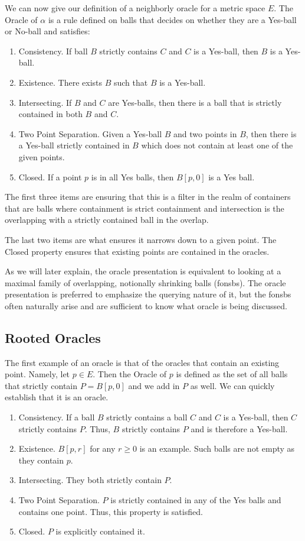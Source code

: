 \documentclass[12pt]{article}
\begin{document}
We can now give our definition of a neighborly oracle for a metric space $E$. The Oracle of $\alpha$ is a rule defined on balls that decides on whether they are a Yes-ball or No-ball and satisfies: 
\begin{enumerate}
    \item Consistency. If ball $B$ strictly contains $C$ and $C$ is a Yes-ball, then $B$ is a Yes-ball.
    \item Existence. There exists $B$ such that $B$ is a Yes-ball.
    \item Intersecting. If $B$ and $C$ are Yes-balls, then there is a ball that is strictly contained in both $B$ and $C$. 
    \item Two Point Separation. Given a Yes-ball $B$ and two points in $B$, then there is a Yes-ball strictly contained in $B$ which does not contain at least one of the given points. 
    \item Closed. If a point $p$ is in all Yes balls, then $B[p,0]$ is a Yes ball. 
\end{enumerate}

The first three items are ensuring that this is a filter in the realm of containers that are balls where containment is strict containment and intersection is the overlapping with a strictly contained ball in the overlap. 

The last two items are what ensures it narrows down to a given point. The Closed property ensures that existing points are contained in the oracles. 

As we will later explain, the oracle presentation is equivalent to looking at a maximal family of overlapping, notionally shrinking balls (fonsbs). The oracle presentation is preferred to emphasize the querying nature of it, but the fonsbs often naturally arise and are sufficient to know what oracle is being discussed. 

\subsection{Rooted Oracles}

The first example of an oracle is that of the oracles that contain an existing point. Namely, let $p \in E$. Then the Oracle of $p$ is defined as the set of all balls that strictly contain $P = B[p,0]$ and we add in $P$ as well. We can quickly establish that it is an oracle.

\begin{enumerate}
    \item Consistency. If a ball $B$ strictly contains a ball $C$ and $C$ is a Yes-ball, then $C$ strictly contains $P$. Thus, $B$ strictly contains $P$ and is therefore a Yes-ball. 
    \item Existence. $B[p, r]$ for any $r \geq 0$ is an example. Such balls are not empty as they contain $p$. 
    \item Intersecting. They both strictly contain $P$. 
    \item Two Point Separation. $P$ is strictly contained in any of the Yes balls and contains one point. Thus, this property is satisfied. 
    \item Closed. $P$ is explicitly contained it. 
\end{enumerate}
\end{document}
